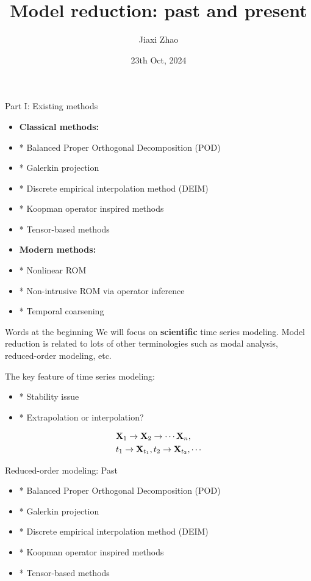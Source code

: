 \documentclass{beamer}
\title[Model Reduction]{Model reduction: past and present}
\author[ZJX]{Jiaxi Zhao}
\date{23th Oct, 2024}
\begin{document}
\par \setlength{\parindent}{2em}

\begin{frame}
\titlepage

\end{frame}

\begin{frame}{Part I: Existing methods}
	\begin{itemize}
		\item \textbf{Classical methods:}
		\item * Balanced Proper Orthogonal Decomposition (POD)
		\item * Galerkin projection
		\item * Discrete empirical interpolation method (DEIM)
		\item * Koopman operator inspired methods
		\item * Tensor-based methods
		\item \textbf{Modern methods:}
		\item * Nonlinear ROM
		\item * Non-intrusive ROM via operator inference
		\item * Temporal coarsening
	\end{itemize}
\end{frame}


\begin{frame}{Words at the beginning}
	We will focus on \textbf{scientific} time series modeling. Model reduction is related to lots of other terminologies such as 
	modal analysis, reduced-order modeling, etc.

	The key feature of time series modeling:
	\begin{itemize}
		\item * Stability issue
		\item * Extrapolation or interpolation?
	\end{itemize}
	\begin{equation*}
		\begin{aligned}
			& \mathbf{X}_1 \rightarrow \mathbf{X}_2 \rightarrow \cdots \mathbf{X}_n,		\\
			& t_1 \rightarrow \mathbf{X}_{t_1}, t_2 \rightarrow \mathbf{X}_{t_2}, \cdots
		\end{aligned}
	\end{equation*}
\end{frame}

\begin{frame}{Reduced-order modeling: Past}
	\begin{itemize}
		\item * Balanced Proper Orthogonal Decomposition (POD)
		\item * Galerkin projection
		\item * Discrete empirical interpolation method (DEIM)
		\item * Koopman operator inspired methods
		\item * Tensor-based methods\footnotemark
	\end{itemize}
\end{frame}
\end{document}
